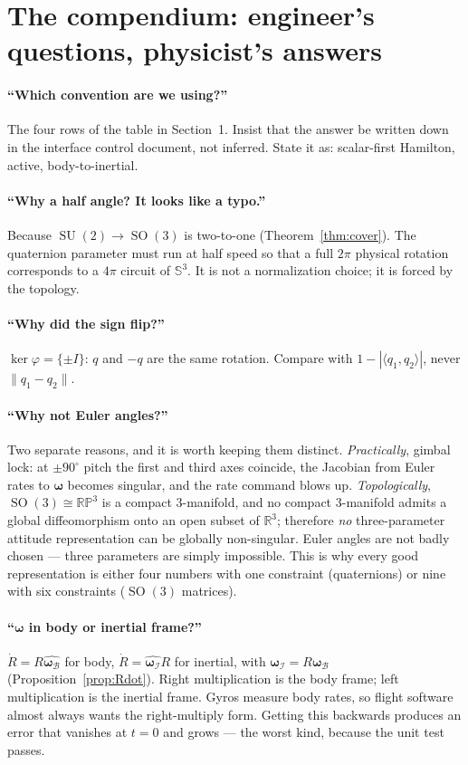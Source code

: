 \documentclass[11pt]{article}
\DeclareMathOperator{\SO}{SO}
\DeclareMathOperator{\SU}{SU}
\newcommand{\R}{\mathbb{R}}
\newcommand{\Sph}{\mathbb{S}}
\newcommand{\RP}{\mathbb{RP}}
\newcommand{\hatmap}[1]{\widehat{#1}}
\theoremstyle{plain}
\theoremstyle{definition}
\begin{document}
\section{The compendium: engineer's questions, physicist's answers}

\paragraph{``Which convention are we using?''}
The four rows of the table in Section~1. Insist that the answer be written down in the interface
control document, not inferred. State it as: scalar-first Hamilton, active, body-to-inertial.

\paragraph{``Why a half angle? It looks like a typo.''}
Because $\SU(2)\to\SO(3)$ is two-to-one (Theorem~\ref{thm:cover}). The quaternion parameter must
run at half speed so that a full $2\pi$ physical rotation corresponds to a $4\pi$ circuit of
$\Sph^3$. It is not a normalization choice; it is forced by the topology.

\paragraph{``Why did the sign flip?''}
$\ker\varphi=\{\pm I\}$: $q$ and $-q$ are the same rotation. Compare with
$1-|\langle q_1,q_2\rangle|$, never $\|q_1-q_2\|$.

\paragraph{``Why not Euler angles?''}
Two separate reasons, and it is worth keeping them distinct. \emph{Practically}, gimbal lock: at
$\pm90^\circ$ pitch the first and third axes coincide, the Jacobian from Euler rates to
$\bm\omega$ becomes singular, and the rate command blows up. \emph{Topologically}, $\SO(3)\cong\RP^3$
is a compact $3$-manifold, and no compact $3$-manifold admits a global diffeomorphism onto an open
subset of $\R^3$; therefore \emph{no} three-parameter attitude representation can be globally
non-singular. Euler angles are not badly chosen --- three parameters are simply impossible. This is
why every good representation is either four numbers with one constraint (quaternions) or nine with
six constraints ($\SO(3)$ matrices).

\paragraph{``$\bm\omega$ in body or inertial frame?''}
$\dot R=R\hatmap{\bm\omega_{\mathcal B}}$ for body, $\dot R=\hatmap{\bm\omega_{\mathcal I}}R$ for
inertial, with $\bm\omega_{\mathcal I}=R\bm\omega_{\mathcal B}$
(Proposition~\ref{prop:Rdot}). Right multiplication is the body frame; left multiplication is the
inertial frame. Gyros measure body rates, so flight software almost always wants the right-multiply
form. Getting this backwards produces an error that vanishes at $t=0$ and grows --- the worst kind,
because the unit test passes.
\end{document}
